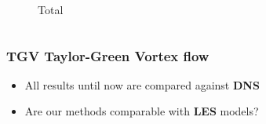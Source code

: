 \begin{frame}
\begin{columns}
\begin{column}{0.5\textwidth}
\begin{figure}
     \vspace*{-0.8cm}
     \caption{Total}
   \end{figure}
   \end{column}
 \end{columns}
 \begin{overlayarea}{\textwidth}{1.5cm}
  \end{overlayarea}
\end{frame}
\addtocounter{framenumber}{-1}
\begin{frame}
 \frametitle{TGV {\small Taylor-Green Vortex flow}}
 \vfill
 {\large
 \begin{itemize}
 	\item All results until now are compared against \textbf{DNS}
 \end{itemize}
 \vspace*{0.5cm}
  \begin{itemize}
  	\item Are our methods comparable with \textbf{LES} models?
 \end{itemize}}
 \vfill
\end{frame}
